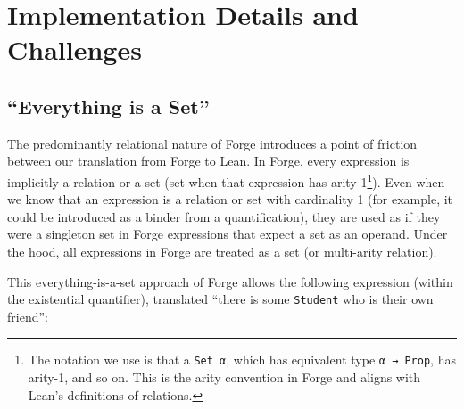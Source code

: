 \section{Implementation Details and Challenges}\label{sec:implementation}

\subsection{``Everything is a Set''}\label{sec:everything-is-a-set}
The predominantly relational nature of Forge introduces a point of friction between our translation from Forge to Lean. In Forge, every expression is implicitly a relation or a set (set when that expression has arity-1\footnote{The notation we use is that a \texttt{Set α}, which has equivalent type \texttt{α → Prop}, has arity-1, and so on. This is the arity convention in Forge and aligns with Lean's definitions of relations.}). Even when we know that an expression is a relation or set with cardinality 1 (for example, it could be introduced as a binder from a quantification), they are used as if they were a singleton set in Forge expressions that expect a set as an operand. Under the hood, all expressions in Forge are treated as a set (or multi-arity relation). 

This everything-is-a-set approach of Forge allows the following expression (within the existential quantifier), translated ``there is some \texttt{Student} who is their own friend'': 

